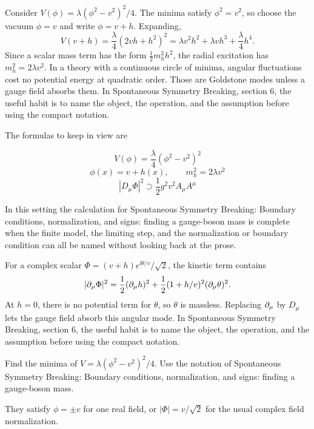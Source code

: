 Consider \(V(\phi)=\lambda(\phi^2-v^2)^2/4\).  The minima satisfy \(\phi^2=v^2\), so choose the vacuum \(\phi=v\) and write \(\phi=v+h\).  Expanding,
\[
  V(v+h)=\frac{\lambda}{4}(2vh+h^2)^2
  =\lambda v^2h^2+\lambda vh^3+\frac{\lambda}{4}h^4.
\]
Since a scalar mass term has the form \(\frac12m_h^2h^2\), the radial excitation has \(m_h^2=2\lambda v^2\).  In a theory with a continuous circle of minima, angular fluctuations cost no potential energy at quadratic order.  Those are Goldstone modes unless a gauge field absorbs them.  In Spontaneous Symmetry Breaking, section 6, the useful habit is to name the object, the operation, and the assumption before using the compact notation.

The formulas to keep in view are

\[
  V(\phi)=\frac{\lambda}{4}(\phi^2-v^2)^2
\]
\[
  \phi(x)=v+h(x),\qquad m_h^2=2\lambda v^2
\]
\[
  |D_\mu\Phi|^2\supset \frac12g^2v^2A_\mu A^\mu
\]

In this setting the calculation for Spontaneous Symmetry Breaking: Boundary conditions, normalization, and signs: finding a gauge-boson mass is complete when the finite model, the limiting step, and the normalization or boundary condition can all be named without looking back at the prose.




\begin{example}
For a complex scalar \(\Phi=(v+h)e^{\ii\theta/v}/\sqrt2\), the kinetic term contains
\[
  |\partial_\mu\Phi|^2=\frac12(\partial_\mu h)^2+\frac12(1+h/v)^2(\partial_\mu\theta)^2.
\]
At \(h=0\), there is no potential term for \(\theta\), so \(\theta\) is massless.  Replacing \(\partial_\mu\) by \(D_\mu\) lets the gauge field absorb this angular mode.  In Spontaneous Symmetry Breaking, section 6, the useful habit is to name the object, the operation, and the assumption before using the compact notation.
\end{example}



\begin{exercise}
Find the minima of \(V=\lambda(\phi^2-v^2)^2/4\).  Use the notation of Spontaneous Symmetry Breaking: Boundary conditions, normalization, and signs: finding a gauge-boson mass.
\begin{answer}
They satisfy \(\phi=\pm v\) for one real field, or \(|\Phi|=v/\sqrt2\) for the usual complex field normalization.
\end{answer}
\end{exercise}

